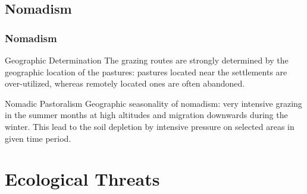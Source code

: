 \documentclass[pdflatex,compress,8pt,
	xcolor={dvipsnames,dvipsnames,svgnames,x11names,table},
	hyperref={colorlinks = true,
	breaklinks = true, 
	urlcolor = NavyBlue, 
	breaklinks = true}]{beamer}
\begin{document}
\subsection{Nomadism}
\begin{frame}\frametitle{Nomadism}

\vspace{2em}
\begin{figure}[H]
	\centering
			\hspace{1mm}
\end{figure}

\begin{block}{Geographic Determination}
The grazing routes are strongly determined by the geographic location of the pastures: pastures located near the settlements are over-utilized, whereas remotely located ones are often abandoned.
\end{block}

\begin{alertblock}{Nomadic Pastoralism}
Geographic seasonality of nomadism: very intensive grazing in the summer months at high altitudes and migration downwards during the winter. This lead to the soil depletion by intensive pressure on selected areas in given time period.
\end{alertblock}

\end{frame}

\section{Ecological Threats}
\end{document}
